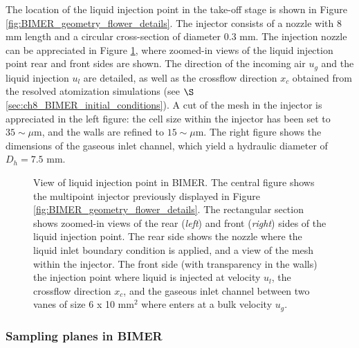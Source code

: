 The location of the liquid injection point in the take-off stage is shown in Figure \ref{fig:BIMER_geometry_flower_details}. The injector consists of a nozzle with 8 mm length and a circular cross-section of diameter 0.3 mm. The injection nozzle can be appreciated in Figure \ref{fig:BIMER_liquid_injector_views}, where zoomed-in views of the liquid injection point rear and front sides are shown. The direction of the incoming air $u_g$ and the liquid injection $u_l$ are detailed, as well as the crossflow direction $x_c$ obtained from the resolved atomization simulations (see $\S$\ref{sec:ch8_BIMER_initial_conditions}). A cut of the mesh in the injector is appreciated in the left figure: the cell size within the injector has been set to $35 \sim \mu$m, and the walls are refined to $15 \sim \mu$m. The right figure shows the dimensions of the gaseous inlet channel, which yield a hydraulic diameter of $D_h = 7.5$ mm. 


\begin{figure}[h!]
	\centering
	\caption[View of liquid injection point in BIMER]{View of liquid injection point in BIMER. The central figure shows the multipoint injector previously displayed in Figure \ref{fig:BIMER_geometry_flower_details}. The rectangular section shows zoomed-in views of the rear (\textsl{left}) and front (\textsl{right}) sides of the liquid injection point. The rear side shows the nozzle where the liquid inlet boundary condition is applied, and a view of the mesh within the injector. The front side (with transparency in the walls) the injection point where liquid is injected at velocity $u_l$, the crossflow direction $x_c$, and the gaseous inlet channel between two vanes of size 6 x 10 mm$^2$ where enters at a bulk velocity $u_g$.}%
	\label{fig:BIMER_liquid_injector_views}
\end{figure}

\subsubsection*{Sampling planes in BIMER}

